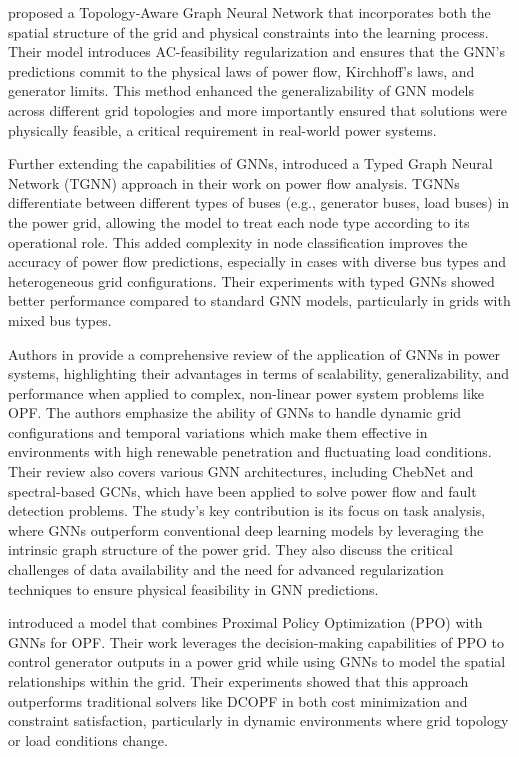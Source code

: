 \cite{donti2021} proposed a Topology-Aware Graph Neural Network that incorporates both the spatial structure of the grid and physical constraints into the learning process. Their model introduces AC-feasibility regularization and ensures that the GNN’s predictions commit to the physical laws of power flow, Kirchhoff’s laws, and generator limits. This method enhanced the generalizability of GNN models across different grid topologies and more importantly ensured that solutions were physically feasible, a critical requirement in real-world power systems.

Further extending the capabilities of GNNs, \cite{lopez2023} introduced a Typed Graph Neural Network (TGNN) approach in their work on power flow analysis. TGNNs differentiate between different types of buses (e.g., generator buses, load buses) in the power grid, allowing the model to treat each node type according to its operational role. This added complexity in node classification improves the accuracy of power flow predictions, especially in cases with diverse bus types and heterogeneous grid configurations. Their experiments with typed GNNs showed better performance compared to standard GNN models, particularly in grids with mixed bus types.

Authors in \cite{liao2022} provide a comprehensive review of the application of GNNs in power systems, highlighting their advantages in terms of scalability, generalizability, and performance when applied to complex, non-linear power system problems like OPF. The authors emphasize the ability of GNNs to handle dynamic grid configurations and temporal variations which make them effective in environments with high renewable penetration and fluctuating load conditions. Their review also covers various GNN architectures, including ChebNet and spectral-based GCNs, which have been applied to solve power flow and fault detection problems. The study’s key contribution is its focus on task analysis, where GNNs outperform conventional deep learning models by leveraging the intrinsic graph structure of the power grid. They also discuss the critical challenges of data availability and the need for advanced regularization techniques to ensure physical feasibility in GNN predictions.

\cite{yang2020} introduced a model that combines Proximal Policy Optimization (PPO) with GNNs for OPF. Their work leverages the decision-making capabilities of PPO to control generator outputs in a power grid while using GNNs to model the spatial relationships within the grid. Their experiments showed that this approach outperforms traditional solvers like DCOPF in both cost minimization and constraint satisfaction, particularly in dynamic environments where grid topology or load conditions change.

